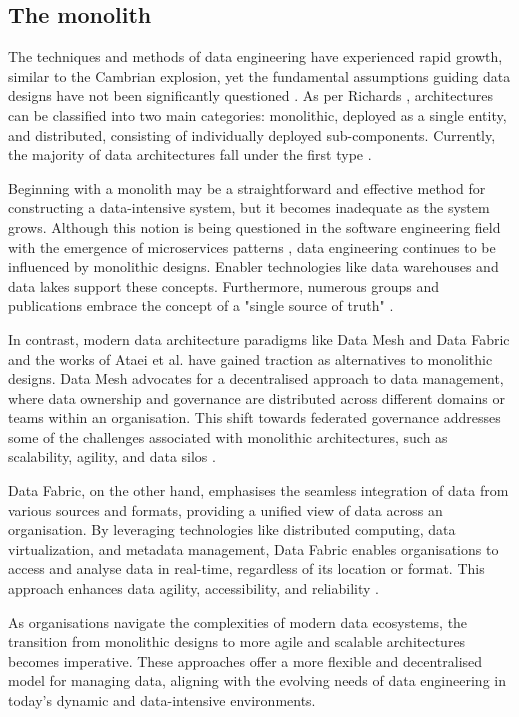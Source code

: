 \documentclass[review]{elsarticle}
\begin{document}
\subsection{The monolith}

The techniques and methods of data engineering have experienced rapid growth, similar to the Cambrian explosion, yet the fundamental assumptions guiding data designs have not been significantly questioned \cite{DataMesh}. As per Richards \cite{richards2020fundamentals}, architectures can be classified into two main categories: monolithic, deployed as a single entity, and distributed, consisting of individually deployed sub-components. Currently, the majority of data architectures fall under the first type \cite{ataei2022state}. 

Beginning with a monolith may be a straightforward and effective method for constructing a data-intensive system, but it becomes inadequate as the system grows. Although this notion is being questioned in the software engineering field with the emergence of microservices patterns \cite{MicroServicesPatterns}, data engineering continues to be influenced by monolithic designs. Enabler technologies like data warehouses and data lakes support these concepts. Furthermore, numerous groups and publications embrace the concept of a "single source of truth" \cite{ataei2022state}.

In contrast, modern data architecture paradigms like Data Mesh \cite{DataMesh} and Data Fabric \cite{GartnerDataFabric2023} and the works of Ataei et al. \cite{ataei2023towards} have gained traction as alternatives to monolithic designs. Data Mesh advocates for a decentralised approach to data management, where data ownership and governance are distributed across different domains or teams within an organisation. This shift towards federated governance addresses some of the challenges associated with monolithic architectures, such as scalability, agility, and data silos \cite{Bode2023}.

Data Fabric, on the other hand, emphasises the seamless integration of data from various sources and formats, providing a unified view of data across an organisation. By leveraging technologies like distributed computing, data virtualization, and metadata management, Data Fabric enables organisations to access and analyse data in real-time, regardless of its location or format. This approach enhances data agility, accessibility, and reliability \cite{Bode2023}.

As organisations navigate the complexities of modern data ecosystems, the transition from monolithic designs to more agile and scalable architectures becomes imperative. These approaches offer a more flexible and decentralised model for managing data, aligning with the evolving needs of data engineering in today's dynamic and data-intensive environments.
\end{document}
